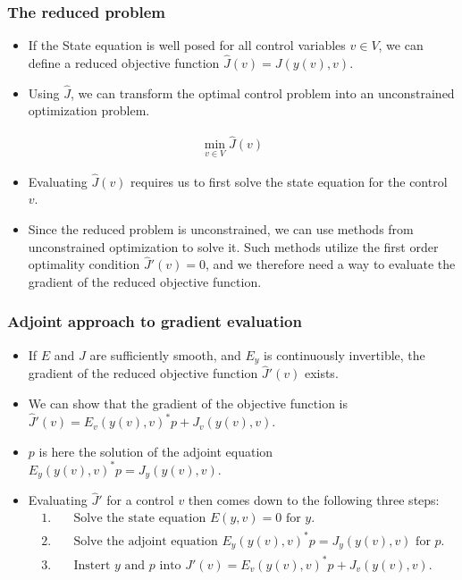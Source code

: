 \documentclass[9pt]{beamer}
\begin{document}
\begin{frame}
\frametitle{The reduced problem}
\begin{itemize}
\item{If the State equation is well posed for all control variables $v\in V$, we can define a reduced objective function $\hat{J}(v) = J(y(v),v)$.}
\item{Using $\hat J$, we can transform the optimal control problem into an unconstrained optimization problem.}
\end{itemize}
\begin{align*}
\min_{v\in V}\hat J (v)
\end{align*}
\begin{itemize}
\item{Evaluating $\hat J(v)$ requires us to first solve the state equation for the control $v$.}
\item{Since the reduced problem is unconstrained, we can use methods from unconstrained optimization to solve it. Such methods utilize the first order optimality condition $\hat J'(v)=0$, and we therefore need a way to evaluate the gradient of the reduced objective function.}
\end{itemize}
\end{frame}
\begin{frame}
\frametitle{Adjoint approach to gradient evaluation}
\begin{itemize}
\item{If $E$ and $J$ are sufficiently smooth, and $E_y$ is continuously invertible, the gradient of the reduced objective function $\hat J'(v)$ exists.}
\item{We can show that the gradient of the objective function is $\hat J'(v)=E_v(y(v),v)^*p +J_v(y(v),v)$. }
\item{$p$ is here the solution of the adjoint equation $E_y(y(v),v)^*p = J_y(y(v),v)$.}
\item{Evaluating $\hat J'$ for a control $v$ then comes down to the following three steps:}
\begin{align*}
1.\quad& \textrm{Solve the state equation $E(y,v)=0$ for $y$.}\\
2.\quad& \textrm{Solve the adjoint equation $E_y(y(v),v)^*p = J_y(y(v),v)$ for $p$.}\\
3.\quad& \textrm{Instert $y$ and $p$ into $J'(v)=E_v(y(v),v)^*p +J_v(y(v),v)$.}\\
\end{align*}
\end{itemize}
\end{frame}
\end{document}
